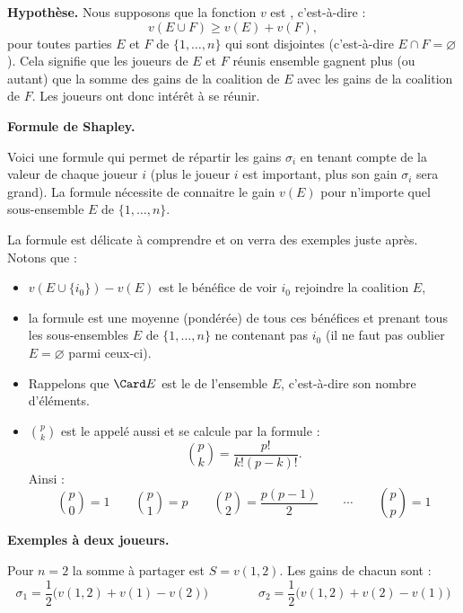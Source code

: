 \documentclass[11pt,class=report,crop=false]{standalone}
\begin{document}
\textbf{Hypothèse.}
Nous supposons que la fonction $v$ est , c'est-à-dire :
$$v(E \cup F) \ge v(E) + v(F),$$
pour toutes parties $E$ et $F$ de $\{1,\ldots,n\}$ qui sont disjointes (c'est-à-dire 
$E \cap F = \varnothing$).
Cela signifie que les joueurs de $E$ et $F$ réunis ensemble gagnent plus (ou autant) que la somme des gains de la coalition de $E$ avec les gains de la coalition de $F$. Les joueurs ont donc intérêt à se réunir.

\bigskip

\textbf{Formule de Shapley.}

Voici une formule qui permet de répartir les gains $\sigma_i$ en tenant compte de la valeur de chaque joueur $i$ (plus le joueur $i$ est important, plus son gain $\sigma_i$ sera grand). La formule nécessite de connaitre le gain $v(E)$ pour n'importe quel sous-ensemble $E$ de $\{1,\ldots,n\}$.

La formule est délicate à comprendre et on verra des exemples juste après.
Notons que :
\begin{itemize}
	\item $v(E \cup \{ i_0 \}) - v(E)$ est le bénéfice de voir $i_0$ rejoindre la coalition $E$,
	\item la formule est une moyenne (pondérée) de tous ces bénéfices et prenant tous les sous-ensembles $E$ de $\{1,\ldots,n\}$ ne contenant pas $i_0$ (il ne faut pas oublier $E=\varnothing$ parmi ceux-ci).
	\item Rappelons que $\Card E$ est le  de l'ensemble $E$, c'est-à-dire son nombre d'éléments.
	\item $\binom{p}{k}$ est le  appelé aussi  et se calcule par la formule :
	$$\binom{p}{k} = \frac{p!}{k!(p-k)!}.$$
	Ainsi :
	$$\binom{p}{0} = 1 \qquad
	\binom{p}{1} = p \qquad
	\binom{p}{2} = \frac{p(p-1)}{2} \qquad \cdots \qquad \binom{p}{p} = 1
	$$
\end{itemize} 


\bigskip

\textbf{Exemples à deux joueurs.}

Pour $n=2$ la somme à partager est $S=v(1,2)$. Les gains de chacun sont :
$$
\sigma_1 = \frac12\big( v(1,2) + v(1) - v(2)\big)
\qquad\qquad
\sigma_2 = \frac12\big( v(1,2) + v(2) - v(1)\big)
$$
\end{document}
